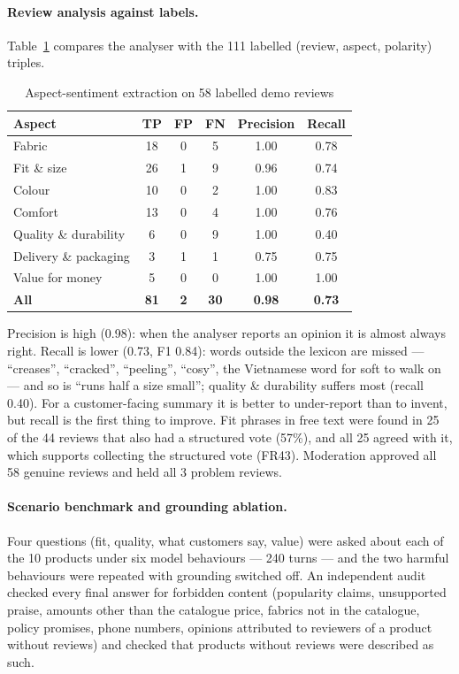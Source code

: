 \paragraph{Review analysis against labels.} Table~\ref{tab:absa} compares the analyser with the 111 labelled (review, aspect, polarity) triples.

\begin{table}[H]
\centering
\small
\caption{Aspect-sentiment extraction on 58 labelled demo reviews}
\label{tab:absa}
\begin{tabular}{@{}lccccc@{}}
\toprule
\textbf{Aspect} & \textbf{TP} & \textbf{FP} & \textbf{FN} & \textbf{Precision} & \textbf{Recall} \\ \midrule
Fabric & 18 & 0 & 5 & 1.00 & 0.78 \\
Fit \& size & 26 & 1 & 9 & 0.96 & 0.74 \\
Colour & 10 & 0 & 2 & 1.00 & 0.83 \\
Comfort & 13 & 0 & 4 & 1.00 & 0.76 \\
Quality \& durability & 6 & 0 & 9 & 1.00 & 0.40 \\
Delivery \& packaging & 3 & 1 & 1 & 0.75 & 0.75 \\
Value for money & 5 & 0 & 0 & 1.00 & 1.00 \\ \midrule
\textbf{All} & \textbf{81} & \textbf{2} & \textbf{30} & \textbf{0.98} & \textbf{0.73} \\ \bottomrule
\end{tabular}
\end{table}

Precision is high (0.98): when the analyser reports an opinion it is almost always right. Recall is lower (0.73, F1 0.84): words outside the lexicon are missed --- ``creases'', ``cracked'', ``peeling'', ``cosy'', the Vietnamese word for soft to walk on --- and so is ``runs half a size small''; quality \& durability suffers most (recall 0.40). For a customer-facing summary it is better to under-report than to invent, but recall is the first thing to improve. Fit phrases in free text were found in 25 of the 44 reviews that also had a structured vote (57\%), and all 25 agreed with it, which supports collecting the structured vote (FR43). Moderation approved all 58 genuine reviews and held all 3 problem reviews.

\paragraph{Scenario benchmark and grounding ablation.} Four questions (fit, quality, what customers say, value) were asked about each of the 10 products under six model behaviours --- 240 turns --- and the two harmful behaviours were repeated with grounding switched off. An independent audit checked every final answer for forbidden content (popularity claims, unsupported praise, amounts other than the catalogue price, fabrics not in the catalogue, policy promises, phone numbers, opinions attributed to reviewers of a product without reviews) and checked that products without reviews were described as such.

